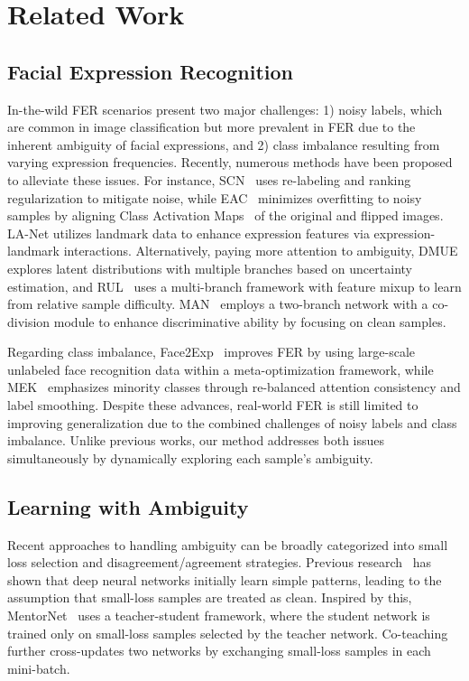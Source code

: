 \section{Related Work}
\subsection{Facial Expression Recognition}
In-the-wild FER scenarios present two major challenges: 1) noisy labels, which are common in image classification but more prevalent in FER due to the inherent ambiguity of facial expressions, and 2) class imbalance resulting from varying expression frequencies. 
Recently, numerous methods have been proposed to alleviate these issues. 
For instance, SCN~\cite{wang2020suppressing_SCN} uses re-labeling and ranking regularization to mitigate noise, while EAC~\cite{zhang2022learn_EAC} minimizes overfitting to noisy samples by aligning Class Activation Maps~\cite{zhou2016learning_CAM} of the original and flipped images.
LA-Net \cite{wu2023net_LA-Net} utilizes landmark data to enhance expression features via expression-landmark interactions.  
Alternatively, paying more attention to ambiguity, DMUE \cite{she2021dive_DMUE} explores latent distributions with multiple branches based on uncertainty estimation, and RUL~\cite{zhang2021relative_RUL} uses a multi-branch framework with feature mixup to learn from relative sample difficulty. MAN~\cite{zhang2022man} employs a two-branch network with a co-division module to enhance discriminative ability by focusing on clean samples.

Regarding class imbalance, Face2Exp~\cite{zeng2022face2exp} improves FER by using large-scale unlabeled face recognition data within a meta-optimization framework, while MEK~\cite{zhang2024leave_MEK} emphasizes minority classes through re-balanced attention consistency and label smoothing. Despite these advances, real-world FER is still limited to improving generalization due to the combined challenges of noisy labels and class imbalance. Unlike previous works, our method addresses both issues simultaneously by dynamically exploring each sample's ambiguity.

\subsection{Learning with Ambiguity}
Recent approaches to handling ambiguity can be broadly categorized into small loss selection and disagreement/agreement strategies. Previous research~\cite{arpit2017closer_small_loss} has shown that deep neural networks initially learn simple patterns, leading to the assumption that small-loss samples are treated as clean. Inspired by this, MentorNet~\cite{jiang2018mentornet} uses a teacher-student framework, where the student network is trained only on small-loss samples selected by the teacher network. Co-teaching~\cite{han2018co_Co-teaching} further cross-updates two networks by exchanging small-loss samples in each mini-batch.

